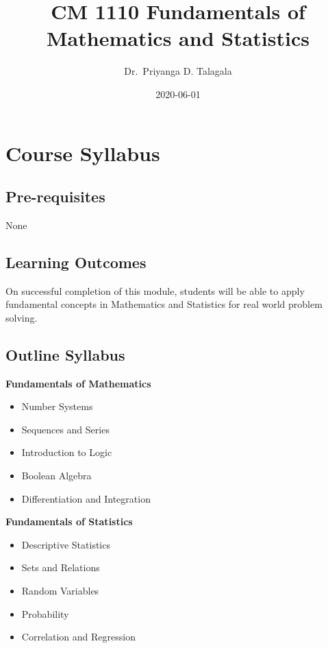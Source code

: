 \documentclass[]{book}
\title{CM 1110 Fundamentals of Mathematics and Statistics}
\author{Dr.~Priyanga D. Talagala}
\date{2020-06-01}
\providecommand{\tightlist}{%
  \setlength{\itemsep}{0pt}\setlength{\parskip}{0pt}}
\begin{document}
\maketitle

{
\setcounter{tocdepth}{1}
\tableofcontents
}
\hypertarget{course-syllabus}{%
\chapter*{Course Syllabus}\label{course-syllabus}}

\hypertarget{pre-requisites}{%
\section*{Pre-requisites}\label{pre-requisites}}

None

\hypertarget{learning-outcomes}{%
\section*{Learning Outcomes}\label{learning-outcomes}}

On successful completion of this module, students will be able to apply fundamental concepts in Mathematics and Statistics for real world problem solving.

\hypertarget{outline-syllabus}{%
\section*{Outline Syllabus}\label{outline-syllabus}}

\textbf{Fundamentals of Mathematics}

\begin{itemize}
\tightlist
\item
  Number Systems
\item
  Sequences and Series
\item
  Introduction to Logic
\item
  Boolean Algebra
\item
  Differentiation and Integration
\end{itemize}

\textbf{Fundamentals of Statistics}

\begin{itemize}
\tightlist
\item
  Descriptive Statistics
\item
  Sets and Relations
\item
  Random Variables
\item
  Probability
\item
  Correlation and Regression
\end{itemize}
\end{document}
